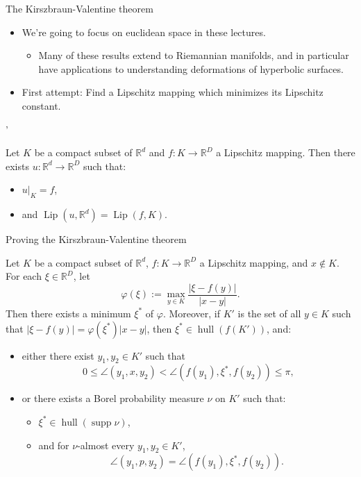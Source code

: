\documentclass[10pt]{beamer}
\newcommand{\RR}{\mathbb{R}}
\DeclareMathOperator{\Lip}{Lip}
\DeclareMathOperator{\hull}{hull}
\DeclareMathOperator{\supp}{supp}
\begin{document}
\begin{frame}{The Kirszbraun-Valentine theorem}
\begin{itemize}
\item We're going to focus on euclidean space in these lectures.
\begin{itemize}
\item Many of these results extend to Riemannian manifolds, and in particular have applications to understanding deformations of hyperbolic surfaces. \pause
\end{itemize}
\item First attempt: Find a Lipschitz mapping which minimizes its Lipschitz constant. \pause
\end{itemize}
'
\begin{theorem}
Let $K$ be a compact subset of $\RR^d$ and $f: K \to \RR^D$ a Lipschitz mapping.
Then there exists $u: \RR^d \to \RR^D$ such that: \pause
\begin{itemize}
\item $u|_K = f$, \pause
\item and $\Lip(u, \RR^d) = \Lip(f, K)$.
\end{itemize}
\end{theorem}
\end{frame}

\begin{frame}{Proving the Kirszbraun-Valentine theorem}
\begin{lemma}
Let $K$ be a compact subset of $\RR^d$, $f: K \to \RR^D$ a Lipschitz mapping, and $x \notin K$.
For each $\xi \in \RR^D$, let 
$$\varphi(\xi) := \max_{y \in K} \frac{|\xi - f(y)|}{|x - y|}.$$
\pause Then there exists a minimum $\xi^*$ of $\varphi$.
\pause Moreover, if $K'$ is the set of all $y \in K$ such that $|\xi - f(y)| = \varphi(\xi^*) |x - y|$, then $\xi^* \in \hull(f(K'))$, and: \pause
\begin{itemize}
    \item either there exist $y_1, y_2 \in K'$ such that
    $$0 \leq \angle (y_1, x, y_2) < \angle(f(y_1), \xi^*, f(y_2)) \leq \pi,$$
    \item or there exists a Borel probability measure $\nu$ on $K'$ such that: \pause
    \begin{itemize}
    \item $\xi^* \in \hull(\supp \nu)$,
    \item and for $\nu$-almost every $y_1, y_2 \in K'$,
    $$\angle(y_1, p, y_2) = \angle(f(y_1), \xi^*, f(y_2)).$$
    \end{itemize}
\end{itemize}
\end{lemma}
\end{frame}
\end{document}
